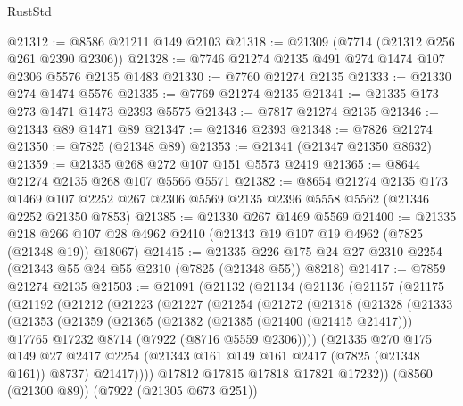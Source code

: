 \begin{lexlean}{RustStd}
\begin{coremodule}
@21312 := @8586 @21211 @149 @2103
@21318 := @21309 (@7714 (@21312 @256 @261 @2390 @2306))
@21328 := @7746 @21274 @2135 @491 @274 @1474 @107 @2306 @5576 @2135 @1483
@21330 := @7760 @21274 @2135
@21333 := @21330 @274 @1474 @5576
@21335 := @7769 @21274 @2135
@21341 := @21335 @173 @273 @1471 @1473 @2393 @5575
@21343 := @7817 @21274 @2135
@21346 := @21343 @89 @1471 @89
@21347 := @21346 @2393
@21348 := @7826 @21274
@21350 := @7825 (@21348 @89)
@21353 := @21341 (@21347 @21350 @8632)
@21359 := @21335 @268 @272 @107 @151 @5573 @2419
@21365 := @8644 @21274 @2135 @268 @107 @5566 @5571
@21382 := @8654
    @21274
    @2135
    @173
    @1469
    @107
    @2252
    @267
    @2306
    @5569
    @2135
    @2396
    @5558
    @5562
    (@21346 @2252 @21350 @7853)
@21385 := @21330 @267 @1469 @5569
@21400 := @21335
    @218
    @266
    @107
    @28
    @4962
    @2410
    (@21343 @19 @107 @19 @4962 (@7825 (@21348 @19)) @18067)
@21415 := @21335 @226 @175 @24 @27 @2310 @2254 (@21343 @55 @24 @55 @2310 (@7825 (@21348 @55)) @8218)
@21417 := @7859 @21274 @2135
@21503 := @21091
    (@21132
      (@21134
        (@21136
          (@21157
            (@21175
              (@21192
                (@21212
                  (@21223
                    (@21227
                      (@21254
                        (@21272
                          (@21318
                            (@21328
                              (@21333
                                (@21353
                                  (@21359
                                    (@21365
                                      (@21382
                                        (@21385 (@21400 (@21415 @21417)))
                                        @17765
                                        @17232
                                        @8714
                                        (@7922 (@8716 @5559 @2306))))
                                    (@21335
                                      @270
                                      @175
                                      @149
                                      @27
                                      @2417
                                      @2254
                                      (@21343 @161 @149 @161 @2417 (@7825 (@21348 @161)) @8737)
                                      @21417))))
                              @17812
                              @17815
                              @17818
                              @17821
                              @17232))
                          (@8560 (@21300 @89))
                          (@7922 (@21305 @673 @251))

\end{coremodule}
\end{lexlean}
